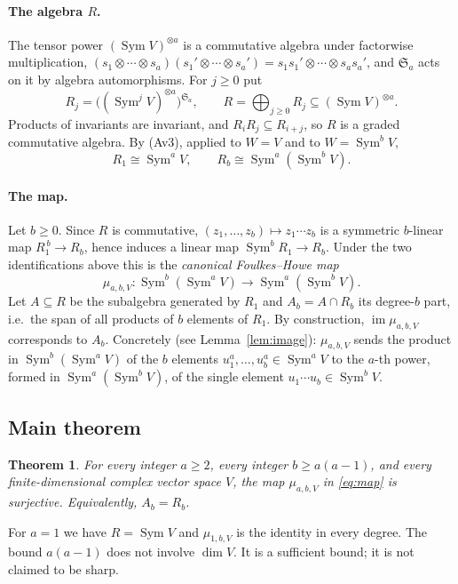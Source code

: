 \documentclass[11pt]{article}
\newtheorem{theorem}{Theorem}
\theoremstyle{remark}
\DeclareMathOperator{\Sym}{Sym}
\newcommand{\Sa}{\mathfrak S_a}
\begin{document}
\paragraph{The algebra $R$.}
The tensor power $(\Sym V)^{\otimes a}$ is a commutative algebra under
factorwise multiplication,
$(s_1\otimes\cdots\otimes s_a)(s_1'\otimes\cdots\otimes s_a')
=s_1s_1'\otimes\cdots\otimes s_as_a'$, and $\Sa$ acts on it by algebra
automorphisms. For $j\ge0$ put
\[
 R_j=\bigl((\Sym^j V)^{\otimes a}\bigr)^{\Sa},\qquad
 R=\bigoplus_{j\ge0}R_j\subseteq(\Sym V)^{\otimes a}.
\]
Products of invariants are invariant, and $R_iR_j\subseteq R_{i+j}$, so $R$
is a graded commutative algebra. By (Av3), applied to $W=V$ and to
$W=\Sym^bV$,
\[
 R_1\cong\Sym^aV,\qquad R_b\cong\Sym^a(\Sym^bV).
\]

\paragraph{The map.}
Let $b\ge0$. Since $R$ is commutative, $(z_1,\dots,z_b)\mapsto z_1\cdots z_b$
is a symmetric $b$-linear map $R_1^{\,b}\to R_b$, hence induces a linear map
$\Sym^bR_1\to R_b$. Under the two identifications above this is the
\emph{canonical Foulkes--Howe map}
\begin{equation}\label{eq:map}
 \mu_{a,b,V}:\Sym^b(\Sym^a V)\longrightarrow\Sym^a(\Sym^b V).
\end{equation}
Let $A\subseteq R$ be the subalgebra generated by $R_1$ and $A_b=A\cap R_b$
its degree-$b$ part, i.e.\ the span of all products of $b$ elements of
$R_1$. By construction, $\operatorname{im}\mu_{a,b,V}$ corresponds to
$A_b$. Concretely (see Lemma~\ref{lem:image}): $\mu_{a,b,V}$ sends the
product in $\Sym^b(\Sym^aV)$ of the $b$ elements $u_1^a,\dots,u_b^a\in\Sym^aV$
to the $a$-th power, formed in $\Sym^a(\Sym^bV)$, of the single element
$u_1\cdots u_b\in\Sym^bV$.

\subsection{Main theorem}

\begin{theorem}\label{thm:main}
For every integer $a\ge2$, every integer $b\ge a(a-1)$, and every
finite-dimensional complex vector space $V$, the map
$\mu_{a,b,V}$ in \eqref{eq:map} is surjective. Equivalently, $A_b=R_b$.
\end{theorem}

For $a=1$ we have $R=\Sym V$ and $\mu_{1,b,V}$ is the identity in every
degree. The bound $a(a-1)$ does not involve $\dim V$. It is a sufficient
bound; it is not claimed to be sharp.
\end{document}
